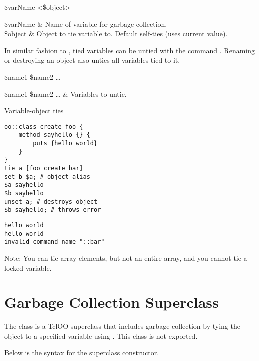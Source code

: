 \documentclass{article}
\begin{document}
\begin{syntax}
 \$varName <\$object>
\end{syntax}
\begin{args}
\$varName & Name of variable for garbage collection. \\
\$object & Object to tie variable to. Default self-ties (uses current value).
\end{args}

In similar fashion to , tied variables can be untied with the command . Renaming or destroying an object also unties all variables tied to it. 
\begin{syntax}
 \$name1 \$name2 …
\end{syntax}
\begin{args}
\$name1 \$name2 … & Variables to untie.
\end{args}

\begin{example}{Variable-object ties}
\begin{lstlisting}
oo::class create foo {
    method sayhello {} {
        puts {hello world}
    }
}
tie a [foo create bar]
set b $a; # object alias
$a sayhello
$b sayhello
unset a; # destroys object
$b sayhello; # throws error
\end{lstlisting}
\tcblower
\begin{lstlisting}
hello world
hello world
invalid command name "::bar"
\end{lstlisting}
\end{example}
Note: You can tie array elements, but not an entire array, and you cannot tie a locked variable.

\clearpage
\section{Garbage Collection Superclass}
The class  is a TclOO superclass that includes garbage collection by tying the object to a specified variable using . This class is not exported.

Below is the syntax for the superclass constructor.
\end{document}
